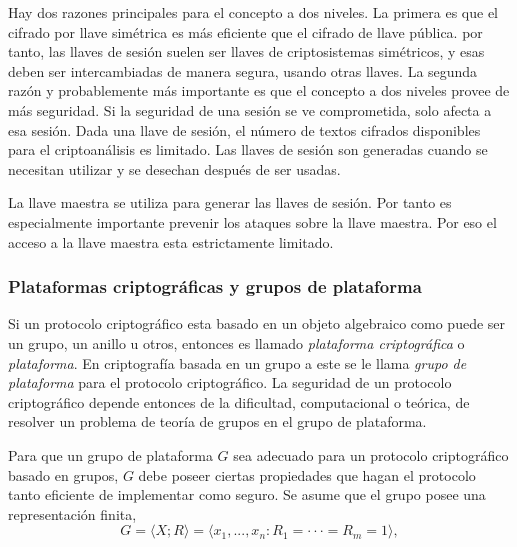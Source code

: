 \documentclass[12pt]{article}
\theoremstyle{definition}
\begin{document}
Hay dos razones principales para el concepto a dos niveles. La primera es que el cifrado por llave simétrica es más eficiente que el cifrado de llave pública. por tanto, las llaves de sesión suelen ser llaves de criptosistemas simétricos, y esas deben ser intercambiadas de manera segura, usando otras llaves. La segunda razón y probablemente más importante es que el concepto a dos niveles provee de más seguridad. Si la seguridad de una sesión se ve comprometida, solo afecta a esa sesión. Dada una llave de sesión, el número de textos cifrados disponibles para el criptoanálisis es limitado. Las llaves de sesión son generadas cuando se necesitan utilizar y se desechan después de ser usadas.

La llave maestra se utiliza para generar las llaves de sesión. Por tanto es especialmente importante prevenir los ataques sobre la llave maestra. Por eso el acceso a la llave maestra esta estrictamente limitado.





















\subsubsection{Plataformas criptográficas y grupos de plataforma}

Si un protocolo criptográfico esta basado en un objeto algebraico como puede ser un grupo, un anillo u otros, entonces es llamado \textit{plataforma criptográfica} o \textit{plataforma}. En criptografía basada en un grupo a este se le llama \textit{grupo de plataforma} para el protocolo criptográfico. La seguridad de un protocolo criptográfico depende entonces de la dificultad, computacional o teórica, de resolver un problema de teoría de grupos en el grupo de plataforma.

Para que un grupo de plataforma $G$ sea adecuado para un protocolo criptográfico basado en grupos, $G$ debe poseer ciertas propiedades que hagan el protocolo tanto eficiente de implementar como seguro. Se asume que el grupo posee una representación finita,
$$G = \langle X;R\rangle=\langle x_1,...,x_n: R_1=\cdot\cdot\cdot=R_m=1\rangle,$$
\end{document}
